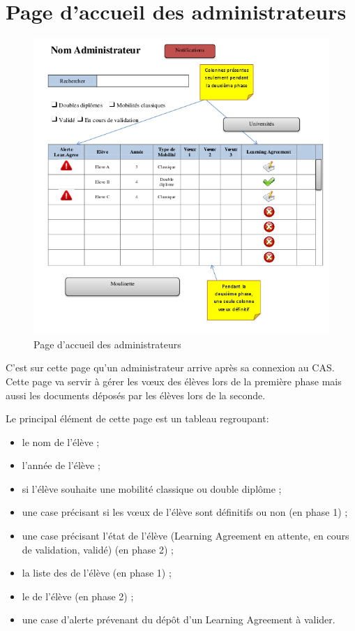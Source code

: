 \section{Page d'accueil des administrateurs}
\label{sec::home_admin}

\begin{figure}[H]
	\includegraphics[scale=0.7]{Admin/HomeAd.png}
	\caption{Page d'accueil des administrateurs}
\end{figure}

C'est sur cette page qu'un administrateur arrive après sa connexion au CAS. Cette page va servir à gérer les vœux des élèves lors de la première phase mais aussi les documents déposés par les élèves lors de la seconde.

Le principal élément de cette page est un tableau regroupant:
\begin{itemize}
 	\item le nom de l'élève ;
 	\item l'année de l'élève ;
 	\item si l'élève souhaite une mobilité classique ou double diplôme ;
 	\item une case précisant si les vœux de l'élève sont définitifs ou non (en phase 1) ;
 	\item une case précisant l'état de l'élève (Learning Agreement en attente, en cours de validation, validé) (en phase 2) ;
 	\item la liste des \voe de l'élève (en phase 1) ;
 	\item le \voe de l'élève (en phase 2) ;
 	\item une case d'alerte prévenant du dépôt d'un Learning Agreement à valider.
 \end{itemize}
 
